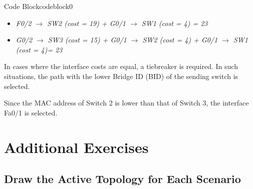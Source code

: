 \documentclass[a4paper]{book}
\begin{document}
\begin{enumerate}
\begin{itemize}
		            \begin{ocg}{Code Block}{codeblock}{0}
			            \vspace{0.5cm}
			            \begin{tcolorbox}
				            \small{


					            \begin{itemize}
						            \item \textit{F0/2 $\rightarrow$ SW2 (cost = 19) + G0/1 $\rightarrow$ SW1 (cost = 4) = 23}
						            \item \textit{G0/2 $\rightarrow$ SW3 (cost = 15) + G0/1 $\rightarrow$ SW2 (cost = 4) + G0/1 $\rightarrow$ SW1 (cost = 4)= 23}
					            \end{itemize}
					            In cases where the interface costs are equal, a tiebreaker is required. In such situations, the path with the lower Bridge ID (BID) of the sending switch is selected.

					            Since the MAC address of Switch 2 is lower than that of Switch 3, the interface Fa0/1 is selected.
				            }
			            \end{tcolorbox}
		            \end{ocg}

	      \end{itemize}


\end{enumerate}

\newpage
\section*{Additional Exercises}

\subsection*{Draw the Active Topology for Each Scenario}
\end{document}
